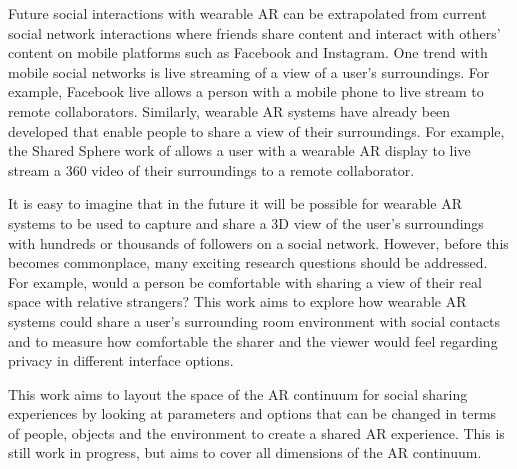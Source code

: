 Future social interactions with wearable AR can be extrapolated from current social network interactions where friends share content and interact with others' content on mobile platforms such as Facebook and Instagram. One trend with mobile social networks is live streaming of a view of a user’s surroundings. For example, Facebook live allows a person with a mobile phone to live stream to remote collaborators. Similarly, wearable AR systems have already been developed that enable people to share a view of their surroundings. For example, the Shared Sphere work of \cite{lee2017mixed} allows a user with a wearable AR display to live stream a 360 video of their surroundings to a remote collaborator. 

It is easy to imagine that in the future it will be possible for wearable AR systems to be used to capture and share a 3D view of the user's surroundings with hundreds or thousands of followers on a social network. However, before this becomes commonplace, many exciting research questions should be addressed. For example, would a person be comfortable with sharing a view of their real space with relative strangers? This work aims to explore how wearable AR systems could share a user’s surrounding room environment with social contacts and to measure how comfortable the sharer and the viewer would feel regarding privacy in different interface options. 



This work aims to layout the space of the AR continuum for social sharing experiences by looking at parameters and options that can be changed in terms of people, objects and the environment to create a shared AR experience. This is still work in progress, but aims to cover all dimensions of the AR continuum.



